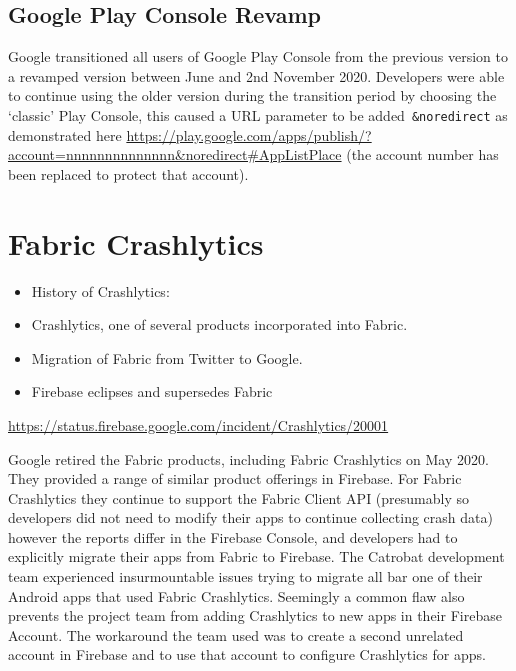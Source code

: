 \subsection{Google Play Console Revamp}
Google transitioned all users of Google Play Console from the previous version to a revamped version between June and 2nd November 2020. Developers were able to continue using the older version during the transition period by choosing the `classic' Play Console, this caused a URL parameter to be added~\texttt{\&noredirect} as demonstrated here
\url{https://play.google.com/apps/publish/?account=nnnnnnnnnnnnnn\&noredirect#AppListPlace} (the account number has been replaced to protect that account).

\section{Fabric Crashlytics}

\begin{itemize}
    \item History of Crashlytics:
    \item Crashlytics, one of several products incorporated into Fabric.
    \item Migration of Fabric from Twitter to Google.
    \item Firebase eclipses and supersedes Fabric
\end{itemize}

\url{https://status.firebase.google.com/incident/Crashlytics/20001}

Google retired the Fabric products, including Fabric Crashlytics on  May 2020. They provided a range of similar product offerings in Firebase. For Fabric Crashlytics they continue to support the Fabric Client API (presumably so developers did not need to modify their apps to continue collecting crash data) however the reports differ in the Firebase Console, and developers had to explicitly migrate their apps from Fabric to Firebase. The Catrobat development team experienced insurmountable issues trying to migrate all bar one of their Android apps that used Fabric Crashlytics. Seemingly a common flaw also prevents the project team from adding Crashlytics to new apps in their Firebase Account. The workaround the team used was to create a second unrelated account in Firebase and to use that account to configure Crashlytics for apps. %


